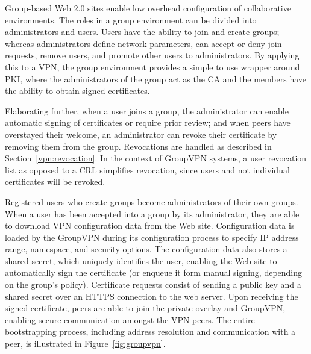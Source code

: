 Group-based Web 2.0 sites enable low overhead configuration of collaborative
environments.  The roles in a group environment can be divided into
administrators and users.  Users have the ability to join and create groups;
whereas administrators define network parameters, can accept or deny join
requests, remove users, and promote other users to administrators.  By applying
this to a VPN, the group environment provides a simple to use wrapper around
PKI, where the administrators of the group act as the CA and the members have
the ability to obtain signed certificates.  

Elaborating further, when a user joins a group, the administrator can enable
automatic signing of certificates or require prior review; and when peers have
overstayed their welcome, an administrator can revoke their certificate by
removing them from the group.  Revocations are handled as described in
Section~\ref{vpn:revocation}.  In the context of GroupVPN systems, a user
revocation list as opposed to a CRL simplifies revocation, since users and not
individual certificates will be revoked.

Registered users who create groups become administrators of their own groups.
When a user has been accepted into a group by its administrator, they are able
to download VPN configuration data from the Web site.  Configuration data is
loaded by the GroupVPN during its configuration process to specify IP address
range, namespace, and security options.  The configuration data also stores a
shared secret, which uniquely identifies the user, enabling the Web site to
automatically sign the certificate (or enqueue it form manual signing,
depending on the group's policy).  Certificate requests consist of sending a
public key and a shared secret over an HTTPS connection to the web server.
Upon receiving the signed certificate, peers are able to join the private
overlay and GroupVPN, enabling secure communication amongst the VPN peers.  The
entire bootstrapping process, including address resolution and communication
with a peer, is illustrated in Figure~\ref{fig:groupvpn}.

